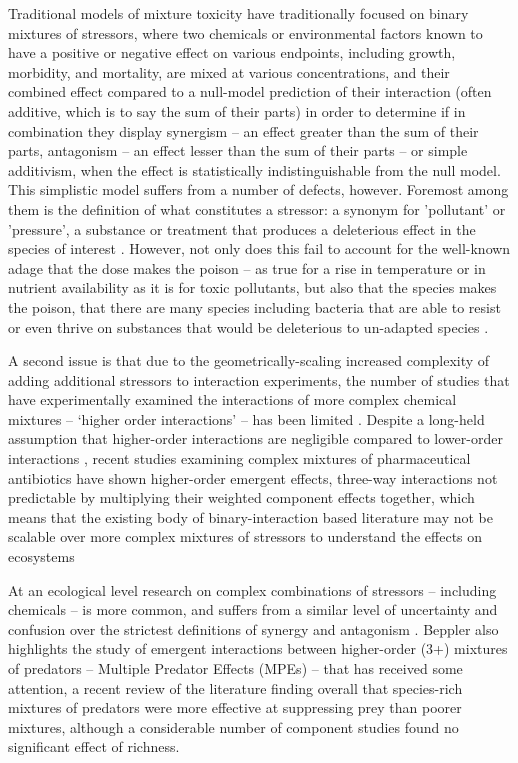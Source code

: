 \documentclass[review,12pt]{elsarticle}
\begin{document}
Traditional models of mixture toxicity have traditionally focused on binary mixtures of stressors, where two chemicals or environmental factors known to have a positive or negative effect on various endpoints, including growth, morbidity, and mortality, are mixed at various concentrations, and their combined effect compared to a null-model prediction of their interaction (often additive, which is to say the sum of their parts) in order to determine if in combination they display synergism – an effect greater than the sum of their parts, antagonism – an effect lesser than the sum of their parts – or simple additivism, when the effect is statistically indistinguishable from the null model. This simplistic model suffers from a number of defects, however. Foremost among them is the definition of what constitutes a stressor: a synonym for 'pollutant' or 'pressure', a substance or treatment that produces a deleterious effect in the species of interest \cite{Piggott2015}. However, not only does this fail to account for the well-known adage that the dose makes the poison – as true for a rise in temperature or in nutrient availability as it is for toxic pollutants, but also that the species makes the poison, that there are many species including bacteria that are able to resist or even thrive on substances that would be deleterious to un-adapted species \cite{Malik2004,Gadd2009}. 

A second issue is that due to the geometrically-scaling increased complexity of adding additional stressors to interaction experiments, the number of studies that have experimentally examined the interactions of more complex chemical mixtures – ‘higher order interactions’ – has been limited \cite{Beppler2016UncoveringStressors}. Despite a long-held assumption that higher-order interactions are negligible compared to lower-order interactions \cite{Tekin2017PrevalenceInteractions}, recent studies examining complex mixtures of pharmaceutical antibiotics have shown higher-order emergent effects,  three-way interactions not predictable by multiplying their weighted component effects together, which means that the existing body of binary-interaction based literature may not be scalable over more complex mixtures of stressors to understand the effects on ecosystems \cite{Tekin2016, Zimmer2016, Tekin2017}

At an ecological level research on complex combinations of stressors – including chemicals – is more common, and suffers from a similar level of uncertainty and confusion over the strictest definitions of synergy and antagonism \cite{Cote2016}.  Beppler also highlights the study of emergent interactions between higher-order (3+) mixtures of predators – Multiple Predator Effects (MPEs) – that has received some attention, a recent review of the literature \cite{Griffin2013EffectsMeta-analysis} finding overall that species-rich mixtures of predators were more effective at suppressing prey than poorer mixtures, although a considerable number of component studies found no significant effect of richness. 
\end{document}
